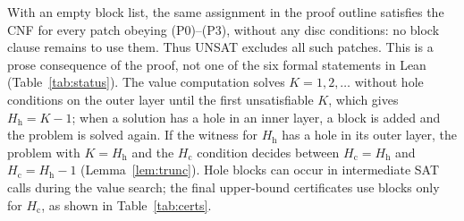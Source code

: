 \documentclass[10pt,a4paper]{article}
\theoremstyle{definition}
\theoremstyle{remark}
\newcommand{\Hc}{H_{\mathrm c}}
\newcommand{\Hh}{H_{\mathrm h}}
\begin{document}
With an empty block list, the same assignment in the proof outline
satisfies the CNF for every patch obeying (P0)--(P3), without any disc
conditions: no block clause remains to use them. Thus UNSAT excludes all
such patches. This is a prose consequence of the proof, not one of the
six formal statements in Lean (Table~\ref{tab:status}). The value computation solves
$K=1,2,\dots$ without hole conditions on the outer layer until the first
unsatisfiable $K$, which gives $\Hh=K-1$; when a solution has a hole in
an inner layer, a block is added and the problem is solved again. If the
witness for $\Hh$ has a hole in its outer layer, the problem with $K=\Hh$
and the $\Hc$ condition decides between $\Hc=\Hh$ and $\Hc=\Hh-1$
(Lemma~\ref{lem:trunc}). Hole blocks can occur in intermediate SAT
calls during the value search; the final upper-bound certificates use
blocks only for $\Hc$, as shown in Table~\ref{tab:certs}.
\end{document}
